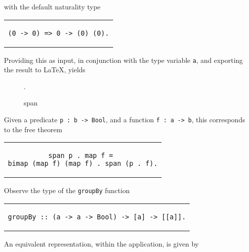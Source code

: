 \documentclass[../Dissertation.tex]{subfiles}
\begin{document}
with the default naturality type
\begin{center}
\begin{tabular}{c}
\begin{lstlisting}
(0 -> 0) => 0 -> (0) (0).
\end{lstlisting}
\end{tabular}
\end{center}
Providing this as input, in conjunction with the type variable \lstinline{a}, and exporting the result to LaTeX, yields
\begin{figure}[H]
  \begin{center}
    .
  \end{center}
  \caption{span}
  \label{fig:petrispan}
\end{figure}
\noindent
Given a predicate \lstinline{p : b -> Bool}, and a function \lstinline{f : a -> b}, this corresponds to the free theorem
\begin{center}
\begin{tabular}{c}
\begin{lstlisting}
span p . map f = 
bimap (map f) (map f) . span (p . f).
\end{lstlisting}
\end{tabular}
\end{center}
Observe the type of the \lstinline{groupBy} function
\begin{center}
\begin{tabular}{c}
\begin{lstlisting}
groupBy :: (a -> a -> Bool) -> [a] -> [[a]].
\end{lstlisting}
\end{tabular}
\end{center}
An equivalent representation, within the application, is given by
\end{document}
